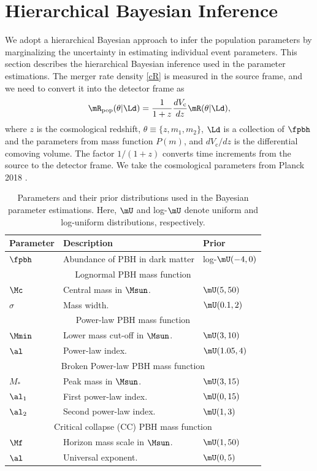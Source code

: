 \documentclass[
reprint,           %
superscriptaddress,%
amsmath,           %
amssymb,           %
aps,               %
prd,               %
notitlepage,       %
longbibliography,  %
floatfix,          %
nofootinbib,
]{revtex4-1}
\def\[{\left[}
\def\e{\begin{equation}}
\def\q{\end{equation}}
\begin{document}
\section{\label{method}Hierarchical Bayesian Inference}
We adopt a hierarchical Bayesian approach to infer the population parameters by marginalizing the uncertainty in estimating individual event parameters.
This section describes the hierarchical Bayesian inference used in the parameter estimations.
The merger rate density \eqref{cR} is measured in the source frame, and we need to convert it into the detector frame as
\e\label{Rpop}
\mR_{\mathrm{pop}}(\theta|\Ld) = \frac{1}{1+z} \frac{dV_\mathrm{c}}{dz} \mR(\theta|\Ld),
\q
where $z$ is the cosmological redshift, $\theta\equiv\{z, m_1, m_2\}$, $\Ld$ is a collection of $\fpbh$ and the parameters from mass function $P(m)$, and $dV_\mathrm{c}/dz$ is the differential comoving volume. The factor $1/(1 + z)$ converts time increments from the source to the detector frame. We take the cosmological parameters from Planck 2018 \cite{Planck:2018vyg}.

\begin{table}[tbp!]
	\centering
	\begin{tabular}{lll}
		\hline\hline
		\textbf{Parameter\quad} & \textbf{Description} & \textbf{Prior} \\
		\hline
		$\fpbh$ & Abundance of PBH in dark matter & log-$\mU(-4, 0)$\\
		\hline
		\multicolumn{3}{c}{Lognormal PBH mass function} \\[1pt]
		$\Mc$ & Central mass in $\Msun$. & $\mU(5, 50)$\\
		$\sigma$ & Mass width. & $\mU(0.1, 2)$\\
		\hline
		\multicolumn{3}{c}{Power-law PBH mass function} \\[1pt]
		$\Mmin$ & Lower mass cut-off in $\Msun$. & $\mU(3, 10)$\\
		$\al$ & Power-law index. & $\mU(1.05, 4)$\\
		\hline
		\multicolumn{3}{c}{Broken Power-law PBH mass function} \\[1pt]
		$M_*$ & Peak mass in $\Msun$. & $\mU(3, 15)$\\
		$\al_1$ & First power-law index. & $\mU(0, 15)$\\
		$\al_2$ & Second power-law index. & $\mU(1, 3)$\\
		\hline
		\multicolumn{3}{c}{Critical collapse (CC) PBH mass function} \\[1pt]
		$\Mf$ & Horizon mass scale in $\Msun$. & $\mU(1, 50)$\\
		$\al$ & Universal exponent. & $\mU(0, 5)$\\
		\hline
	\end{tabular}	
	\caption{\label{table:priors}Parameters and their prior distributions used in the Bayesian parameter estimations. Here, $\mU$ and log-$\mU$ denote uniform and log-uniform distributions, respectively.}
\end{table}
\end{document}
